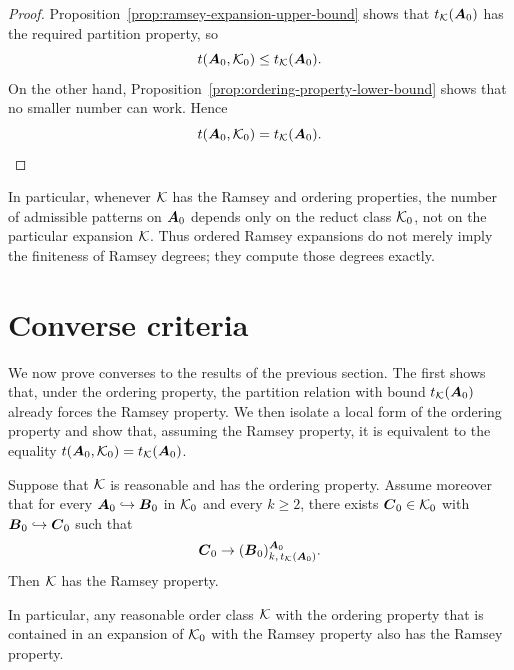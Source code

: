 \begin{proof}
    Proposition~\ref{prop:ramsey-expansion-upper-bound} shows that \(t_{\mathcal{K}}(\boldsymbol{A}_0)\) has the required partition property, so
    \[
        t(\boldsymbol{A}_0,\mathcal{K}_0)\leq t_{\mathcal{K}}(\boldsymbol{A}_0).
    \]
    On the other hand, Proposition~\ref{prop:ordering-property-lower-bound} shows that no smaller number can work. Hence
    \[
        t(\boldsymbol{A}_0,\mathcal{K}_0)=t_{\mathcal{K}}(\boldsymbol{A}_0).
    \]
\end{proof}

In particular, whenever \(\mathcal{K}\) has the Ramsey and ordering properties, the number of admissible patterns on \(\boldsymbol{A}_0\) depends only on the reduct class \(\mathcal{K}_0\), not on the particular expansion \(\mathcal{K}\). Thus ordered Ramsey expansions do not merely imply the finiteness of Ramsey degrees; they compute those degrees exactly.

\section{Converse criteria}

We now prove converses to the results of the previous section. The first shows that, under the ordering property, the partition relation with bound \(t_{\mathcal{K}}(\boldsymbol{A}_0)\) already forces the Ramsey property. We then isolate a local form of the ordering property and show that, assuming the Ramsey property, it is equivalent to the equality \(t(\boldsymbol{A}_0,\mathcal{K}_0)=t_{\mathcal{K}}(\boldsymbol{A}_0)\).

\begin{proposition}
    \label{prop:partition-bound-implies-ramsey}
    Suppose that \(\mathcal{K}\) is reasonable and has the ordering property. Assume
    moreover that for every \(\boldsymbol{A}_0\hookrightarrow\boldsymbol{B}_0\) in \(\mathcal{K}_0\) and
    every \(k\geq 2\), there exists \(\boldsymbol{C}_0\in\mathcal{K}_0\) with
    \(\boldsymbol{B}_0\hookrightarrow\boldsymbol{C}_0\) such that
    \[
        \boldsymbol{C}_0\to(\boldsymbol{B}_0)^{\boldsymbol{A}_0}_{k,\,t_{\mathcal{K}}(\boldsymbol{A}_0)}.
    \]
    Then \(\mathcal{K}\) has the Ramsey property.

    In particular, any reasonable order class \(\mathcal{K}\) with the ordering property that is contained in an expansion of \(\mathcal{K}_0\) with the Ramsey property also has the Ramsey property.
\end{proposition}

